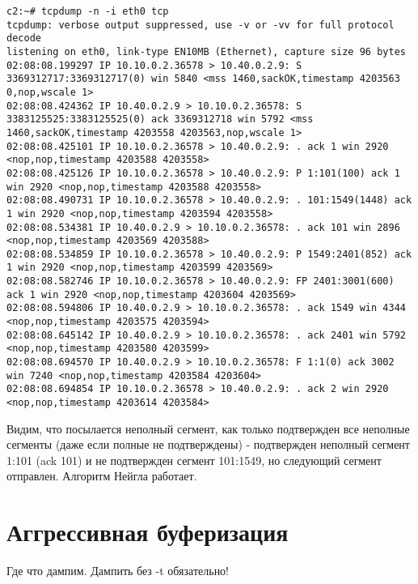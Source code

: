 \documentclass[a4paper,12pt]{article}
\begin{document}
\begin{Verbatim}
c2:~# tcpdump -n -i eth0 tcp
tcpdump: verbose output suppressed, use -v or -vv for full protocol decode
listening on eth0, link-type EN10MB (Ethernet), capture size 96 bytes
02:08:08.199297 IP 10.10.0.2.36578 > 10.40.0.2.9: S 3369312717:3369312717(0) win 5840 <mss 1460,sackOK,timestamp 4203563 0,nop,wscale 1>
02:08:08.424362 IP 10.40.0.2.9 > 10.10.0.2.36578: S 3383125525:3383125525(0) ack 3369312718 win 5792 <mss 1460,sackOK,timestamp 4203558 4203563,nop,wscale 1>
02:08:08.425101 IP 10.10.0.2.36578 > 10.40.0.2.9: . ack 1 win 2920 <nop,nop,timestamp 4203588 4203558>
02:08:08.425126 IP 10.10.0.2.36578 > 10.40.0.2.9: P 1:101(100) ack 1 win 2920 <nop,nop,timestamp 4203588 4203558>
02:08:08.490731 IP 10.10.0.2.36578 > 10.40.0.2.9: . 101:1549(1448) ack 1 win 2920 <nop,nop,timestamp 4203594 4203558>
02:08:08.534381 IP 10.40.0.2.9 > 10.10.0.2.36578: . ack 101 win 2896 <nop,nop,timestamp 4203569 4203588>
02:08:08.534859 IP 10.10.0.2.36578 > 10.40.0.2.9: P 1549:2401(852) ack 1 win 2920 <nop,nop,timestamp 4203599 4203569>
02:08:08.582746 IP 10.10.0.2.36578 > 10.40.0.2.9: FP 2401:3001(600) ack 1 win 2920 <nop,nop,timestamp 4203604 4203569>
02:08:08.594806 IP 10.40.0.2.9 > 10.10.0.2.36578: . ack 1549 win 4344 <nop,nop,timestamp 4203575 4203594>
02:08:08.645142 IP 10.40.0.2.9 > 10.10.0.2.36578: . ack 2401 win 5792 <nop,nop,timestamp 4203580 4203599>
02:08:08.694570 IP 10.40.0.2.9 > 10.10.0.2.36578: F 1:1(0) ack 3002 win 7240 <nop,nop,timestamp 4203584 4203604>
02:08:08.694854 IP 10.10.0.2.36578 > 10.40.0.2.9: . ack 2 win 2920 <nop,nop,timestamp 4203614 4203584>
\end{Verbatim}

Видим, что посылается неполный сегмент, как только подтвержден все неполные сегменты (даже если полные не подтверждены) - подтвержден неполный сегмент 1:101 (ack 101) и не подтвержден сегмент 101:1549, но следующий сегмент отправлен. Алгоритм Нейгла работает.

\section{Аггрессивная буферизация}

Где что дампим.  Дампить без -t обязательно!
\end{document}
